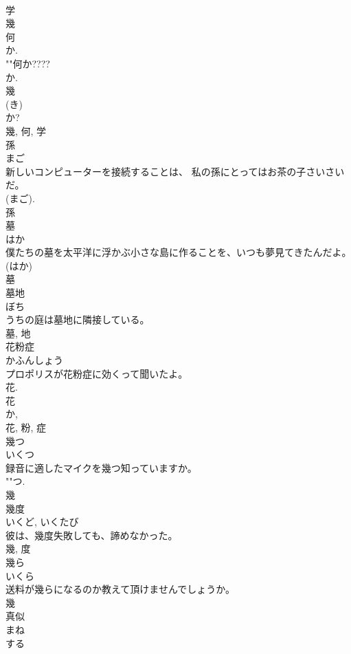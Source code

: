 \documentclass[8pt]{extreport}
\begin{document}
\begin{CJK}{UTF8}{min}
\\	学 
\\	幾 
\\	何 
\\	か. 
\\	""何か????
\\	か. 
\\	幾 
\\	(き) 
\\	か?
\\	幾, 何, 学	
\\	孫	
\\	まご	
\\	新しいコンピューターを接続することは、 私の孫にとってはお茶の子さいさいだ。	
\\	(まご). 
\\	孫	
\\	墓	
\\	はか	
\\	僕たちの墓を太平洋に浮かぶ小さな島に作ることを、いつも夢見てきたんだよ。	
\\	(はか) 
\\	墓	
\\	墓地	
\\	ぼち	
\\	うちの庭は墓地に隣接している。	
\\	墓, 地	
\\	花粉症	
\\	かふんしょう	
\\	プロポリスが花粉症に効くって聞いたよ。	
\\	花. 
\\	花 
\\	か, 
\\	花, 粉, 症	
\\	幾つ	
\\	いくつ	
\\	録音に適したマイクを幾つ知っていますか。	
\\	""つ.
\\	幾	
\\	幾度	
\\	いくど, いくたび	
\\	彼は、幾度失敗しても、諦めなかった。	
\\	幾, 度	
\\	幾ら	
\\	いくら	
\\	送料が幾らになるのか教えて頂けませんでしょうか。	
\\	幾	
\\	真似	
\\	まね	
\\	する 

\end{CJK}
\end{document}
